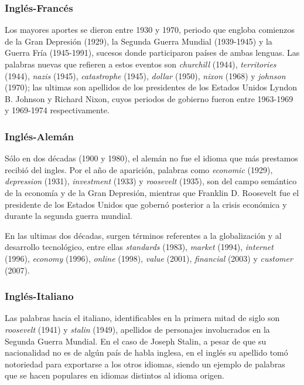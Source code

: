\subsubsection*{Inglés-Francés} %


Los mayores aportes se dieron entre 1930 y 1970, periodo que engloba comienzos de la Gran Depresión (1929), la Segunda Guerra Mundial (1939-1945) y la Guerra Fría (1945-1991), sucesos donde participaron países de ambas lenguas. Las palabras nuevas que refieren a estos eventos son \textit{churchill} (1944), \textit{territories} (1944), \textit{nazis} (1945), \textit{catastrophe} (1945), \textit{dollar} (1950), \textit{nixon} (1968) y \textit{johnson} (1970); las ultimas son apellidos de los presidentes de los Estados Unidos  Lyndon B. Johnson y Richard Nixon, cuyos periodos de gobierno fueron  entre 1963-1969 y 1969-1974 respectivamente.

\subsubsection*{Inglés-Alemán} %

Sólo  en dos décadas (1900  y 1980), el alemán no fue el idioma que más prestamos recibió  del ingles. Por el año de aparición, palabras como \textit{economic} (1929), \textit{depression} (1931), \textit{investment} (1933) y \textit{roosevelt} (1935), son del campo semántico de la economía y de la Gran Depresión,  mientras que  Franklin D. Roosevelt fue el presidente de los Estados Unidos que gobernó posterior a la crisis económica y durante la segunda guerra mundial. 


En las ultimas dos décadas, surgen términos referentes a la globalización y al desarrollo tecnológico, entre ellas \textit{standards} (1983), \textit{market} (1994), \textit{internet} (1996), \textit{economy} (1996), \textit{online} (1998), \textit{value} (2001), \textit{financial} (2003) y \textit{customer} (2007). 
\subsubsection*{Inglés-Italiano} %


Las palabras hacia el italiano, identificables en la primera mitad de siglo son \textit{roosevelt} (1941) y \textit{stalin} (1949), apellidos de personajes involucrados en la Segunda Guerra Mundial. En el caso de Joseph Stalin, a pesar de que su nacionalidad no es de algún país de habla inglesa, en el inglés su apellido tomó notoriedad para exportarse a los otros idiomas, siendo un ejemplo de palabras que se hacen populares en idiomas distintos al idioma origen. 

